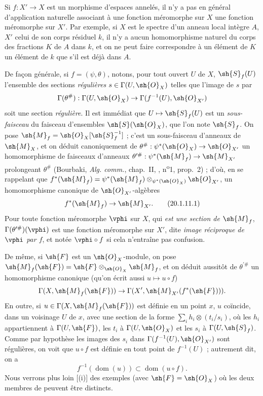 \begin{env}[20.1.11]
Si $f:X'\to X$ est un morphisme d'espaces annelés, il n'y a pas en général d'application naturelle associant à une fonction méromorphe sur $X$ une fonction méromorphe sur $X'$.
Par exemple, si $X$ est le spectre d'un anneau local intègre $A$, $X'$ celui de son corps résiduel $k$, il n'y a aucun homomorphisme naturel du corps des fractions $K$ de $A$ dans $k$, et on ne peut faire correspondre à un élément de $K$ un élément de $k$ que s'il est déjà dans $A$.

De façon générale, si $f=(\psi,\theta)$, notons, pour tout ouvert $U$ de $X$, $\sh{S}_f(U)$ l'ensemble des sections \emph{régulières} $s\in\Gamma(U,\sh{O}_X)$ telles que l'image de $s$ par
\[
  \Gamma(\theta^\#):\Gamma(U,\sh{O}_X)\to\Gamma(f^{-1}(U),\sh{O}_{X'})
\]
soit une section \emph{régulière}.
Il est immédiat que $U\mapsto\sh{S}_f(U)$ est un \emph{sous-faisceau} du faisceau d'ensembles $\sh{S}(\sh{O}_X)$, que l'on note $\sh{S}_f$.
On pose $\sh{M}_f=\sh{O}_X[\sh{S}_f^{-1}]$ ; c'est un sous-faisceau
d'anneaux de $\sh{M}_X$, et on déduit canoniquement de $\theta^\#:\psi^*(\sh{O}_X)\to\sh{O}_{X'}$ un homomorphisme de faisceaux d'anneaux $\theta^{\prime\#}:\psi^*(\sh{M}_f)\to\sh{M}_{X'}$ prolongeant $\theta^\#$ (Bourbaki, \emph{Alg. comm.}, chap.~II, , n\textsuperscript{o}1, prop.~2) ; d'où, en se rappelant que $f^*(\sh{M}_f)=\psi^*(\sh{M}_f)\otimes_{\psi^*(\sh{O}_X)}\sh{O}_{X'}$, un homomorphisme canonique de $\sh{O}_{X'}$-algèbres
\[
\label{IV.20.1.11.1}
  f^*(\sh{M}_f)\to\sh{M}_{X'}.
  \tag{20.1.11.1}
\]
Pour toute fonction méromorphe $\vphi$ sur $X$, qui \emph{est une section de $\sh{M}_f$}, $\Gamma(\theta^{\prime\#})(\vphi)$ est une fonction méromorphe sur $X'$, dite \emph{image réciproque de $\vphi$ par $f$}, et notée $\vphi\circ f$ si cela n'entraîne pas confusion.

De même, si $\sh{F}$ est un $\sh{O}_X$-module, on pose $\sh{M}_f(\sh{F})=\sh{F}\otimes_{\sh{O}_X}\sh{M}_f$, et on déduit aussitôt de $\theta^{\prime\#}$ un homomorphisme canonique (qu'on écrit aussi $u\mapsto u\circ f$)
\[
  \Gamma(X,\sh{M}_f(\sh{F}))\to\Gamma(X',\sh{M}_{X'}(f^*(\sh{F}))).
\]
En outre, si $u\in\Gamma(X,\sh{M}_f(\sh{F}))$ est définie  en un point $x$, $u$ coïncide, dans un voisinage $U$ de $x$, avec une section de la forme $\sum_i h_i\otimes(t_i/s_i)$, où les $h_i$ appartiennent à $\Gamma(U,\sh{F})$, les $t_i$ à $\Gamma(U,\sh{O}_X)$ et les $s_i$ à $\Gamma(U,\sh{S}_f)$.
Comme par hypothèse les images des $s_i$ dans $\Gamma(f^{-1}(U),\sh{O}_{X'})$ sont régulières, on voit que $u\circ f$ est définie en tout point de $f^{-1}(U)$ ; autrement dit, on a
\[
\label{IV.20.1.11.2}
  f^{-1}(\operatorname{dom}(u))\subset\operatorname{dom}(u\circ f).
  \tag{20.1.11.2}
\]
Nous verrons plus loin [(i)] des exemples (avec $\sh{F}=\sh{O}_X$) où les deux membres de  peuvent être distincts.


\end{env}
